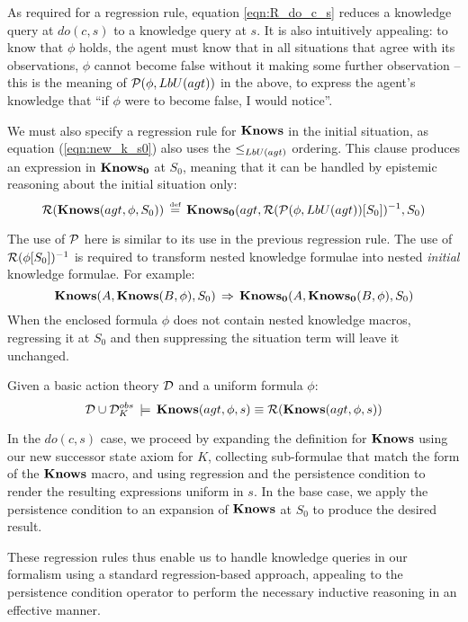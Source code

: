 As required for a regression rule, equation \eqref{eqn:R_do_c_s}
reduces a knowledge query at $do(c,s)$ to a knowledge query at $s$.
It is also intuitively appealing: to know that $\phi$ holds, the
agent must know that in all situations that agree with its observations,
$\phi$ cannot become false without it making some further observation
-- this is the meaning of $\mathcal{P}(\phi,LbU(agt))$ in the above, to
express the agent's knowledge that {}``if $\phi$ were to become
false, I would notice''.

We must also specify a regression rule for $\mathbf{Knows}$ in the initial
situation, as equation (\ref{eqn:new_k_s0}) also uses the $\leq_{LbU(agt)}$
ordering. This clause produces an expression in $\mathbf{Knows_{0}}$ at $S_{0}$,
meaning that it can be handled by epistemic reasoning about the initial
situation only:\begin{equation}
\mathcal{R}(\mathbf{Knows}(agt,\phi,S_{0}))\,\stackrel{\mbox{\tiny def}}{=}\,\mathbf{Knows_{0}}(agt,\mathcal{R}(\mathcal{P}(\phi,LbU(agt))[S_{0}])^{-1},S_{0})\label{eqn:R_s0}\end{equation}


The use of $\mathcal{P}$ here is similar to its use in the previous regression
rule. The use of $\mathcal{R}(\phi[S_{0}])^{-1}$ is required to transform
nested knowledge formulae into nested \emph{initial} knowledge formulae.
For example:\[
\mathbf{Knows}(A,\mathbf{Knows}(B,\phi),S_{0})\,\Rightarrow\,\mathbf{Knows_{0}}(A,\mathbf{Knows_{0}}(B,\phi),S_{0})\]
 When the enclosed formula $\phi$ does not contain nested knowledge
macros, regressing it at $S_{0}$ and then suppressing the situation
term will leave it unchanged.

\begin{thm}
\label{thm:Reg_Knows}Given a basic action theory $\mathcal{D}$ and a uniform
formula $\phi$:\[
\mathcal{D}\cup\mathcal{D}_{K}^{obs}\,\models\,\mathbf{Knows}(agt,\phi,s)\equiv\mathcal{R}(\mathbf{Knows}(agt,\phi,s))\]

\end{thm}
\begin{proofsketch}
In the $do(c,s)$ case, we proceed by expanding the definition for
$\mathbf{Knows}$ using our new successor state axiom for $K$, collecting
sub-formulae that match the form of the $\mathbf{Knows}$ macro, and using
regression and the persistence condition to render the resulting expressions
uniform in $s$. In the base case, we apply the persistence condition
to an expansion of $\mathbf{Knows}$ at $S_{0}$ to produce the desired result. 
\end{proofsketch}
These regression rules thus enable us to handle knowledge queries
in our formalism using a standard regression-based approach, appealing
to the persistence condition operator to perform the necessary inductive
reasoning in an effective manner.\\


